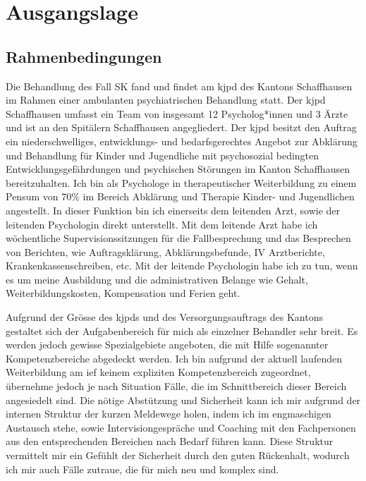 \section{Ausgangslage} \label{Ausgangslage}
\subsection{Rahmenbedingungen}
Die Behandlung des Fall SK fand und findet am \ac{kjpd} des Kantons Schaffhausen im Rahmen einer ambulanten psychiatrischen Behandlung statt. Der \ac{kjpd} Schaffhausen umfasst ein Team von insgesamt 12 Psycholog*innen und 3 Ärzte und ist an den Spitälern Schaffhausen angegliedert. Der \ac{kjpd} besitzt den Auftrag ein niederschwelliges, entwicklungs- und bedarfsgerechtes Angebot zur Abklärung und Behandlung für Kinder und Jugendliche mit psychosozial bedingten Entwicklungsgefährdungen und psychischen Störungen im Kanton Schaffhausen bereitzuhalten. Ich bin als Psychologe in therapeutischer Weiterbildung zu einem Pensum von 70\% im Bereich Abklärung und Therapie Kinder- und Jugendlichen angestellt. In dieser Funktion bin ich einerseits dem leitenden Arzt, sowie der leitenden Psychologin direkt unterstellt. Mit dem leitende Arzt habe ich wöchentliche Supervisionssitzungen für die Fallbesprechung und das Besprechen von Berichten, wie Auftragsklärung,  Abklärungsbefunde, IV Arztberichte, Krankenkassenschreiben, etc. Mit der leitende Psychologin habe ich zu tun, wenn es um meine Ausbildung und die administrativen Belange wie Gehalt, Weiterbildungskosten, Kompensation und Ferien geht.  

Aufgrund der Grösse des \ac{kjpd}s und des Versorgungsauftrags des Kantons gestaltet sich der Aufgabenbereich für mich als einzelner Behandler sehr breit. Es werden jedoch gewisse Spezialgebiete angeboten, die mit Hilfe sogenannter Kompetenzbereiche abgedeckt werden. Ich bin aufgrund der aktuell laufenden Weiterbildung am \ac{ief} keinem expliziten Kompetenzbereich zugeordnet, übernehme jedoch je nach Situation Fälle, die im Schnittbereich dieser Bereich angesiedelt sind. Die nötige Abstützung und Sicherheit kann ich mir aufgrund der internen Struktur der kurzen Meldewege holen, indem ich im engmaschigen Austausch stehe, sowie Intervisiongespräche und Coaching mit den Fachpersonen aus den entsprechenden Bereichen nach Bedarf führen kann. Diese Struktur vermittelt mir ein Gefühlt der Sicherheit durch den guten Rückenhalt, wodurch ich mir auch Fälle zutraue, die für mich neu und komplex sind. 

